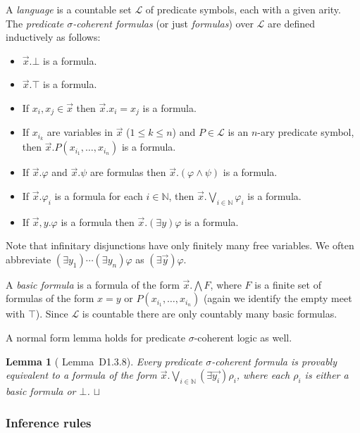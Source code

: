 \documentclass{article}
\theoremstyle{plain}
\newtheorem{lemma}[Theorem]{Lemma}
\def\squareforqed{\hbox{\rlap{$\sqcap$}$\sqcup$}}
\def\qed{\ifmmode\squareforqed\else{\unskip\nobreak\hfil
\penalty50\hskip1em\null\nobreak\hfil\squareforqed
\parfillskip=0pt\finalhyphendemerits=0\endgraf}\fi}
\def\cal#1{{\mathcal #1}}
\def\IN{{\mathbb N}}
\def\calL{{\cal L}}
\begin{document}
A \emph{language} is a countable set $\calL$ of predicate symbols, each with a given arity. The \emph{predicate $\sigma$-coherent formulas} (or just \emph{formulas}) over $\calL$ are defined inductively as follows:
\begin{itemize}
\item
$\vec{x}.\bot$  is a formula.
\item
$\vec{x}.\top$ is a formula.
\item
If  $x_i,x_j \in \vec{x}$ then $\vec{x}.x_i=x_j$ is a formula.
\item
If $x_{i_k}$ are variables in $\vec{x}$ ($1\leq k \leq n$) and $P\in\calL$ is an $n$-ary predicate symbol, then $\vec{x}.P(x_{i_1},\ldots,x_{i_n})$ is a formula.
\item
If $\vec{x}.\varphi$ and $\vec{x}.\psi$ are formulas then $\vec{x}.(\varphi\wedge \psi)$ is a formula.
\item
If $\vec{x}.\varphi_i$ is a formula for each $i\in \IN$, then $\vec{x}.\bigvee_{i\in \IN} \varphi_i$ is a formula.
\item
If $\vec{x},y. \varphi$ is a formula then $\vec{x}.(\exists y)\varphi$ is a formula.
\end{itemize}

Note that infinitary disjunctions have only finitely many free variables. We often abbreviate $(\exists y_1)\cdots(\exists y_n)\varphi$ as $(\exists \vec{y})\varphi$.

A \emph{basic formula} is a formula of the form $\vec{x}.\bigwedge F$, where $F$ is a finite set of formulas of the form $x=y$ or $P(x_{i_1},\ldots,x_{i_n})$ (again we identify the empty meet with $\top$). Since $\calL$ is countable there are only countably many basic formulas.

A normal form lemma holds for predicate $\sigma$-coherent logic as well.

\begin{lemma}[\cite{J02} Lemma~D1.3.8]\label{lem:normalform_pred}
Every predicate $\sigma$-coherent formula is provably equivalent to a formula of the form $\vec{x}.\bigvee_{i\in\IN}(\exists \vec{y_i}) \rho_i$, where each $\rho_i$ is either a basic formula or $\bot$.
\qed
\end{lemma}


\subsubsection{Inference rules}
\end{document}
